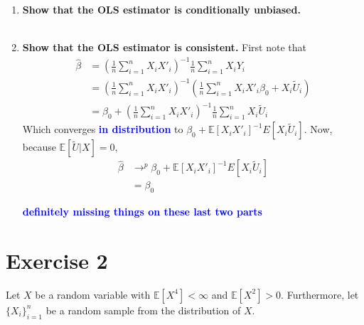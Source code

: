 \documentclass[]{article}
\newcommand{\sumin}{\sum\limits_{i=1}^n} %
\newcommand{\E}{\mathbb{E}}
\newcommand{\fix} [1] {\textbf{\textcolor{blue}{#1}}} %
\begin{document}
\begin{enumerate}[label = (\roman*)]
\item \textbf{Show that the OLS estimator is conditionally unbiased.}\\
\\


\item \textbf{Show that the OLS estimator is consistent.}
First note that 
\begin{align*}
\hat{\beta} & = \left(\frac{1}{n} \sumin X_iX'_i\right)^{-1} \frac{1}{n} \sumin X_iY_i\\
& = \left(\frac{1}{n} \sumin X_iX'_i\right)^{-1} \left(\frac{1}{n} \sumin X_iX'_i\beta_0 + X_i\tilde{U}_i\right) \\
& = \beta_0 + \left(\frac{1}{n} \sumin X_iX'_i\right)^{-1} \frac{1}{n} \sumin X_i\tilde{U}_i
\end{align*}
Which converges \fix{in distribution} to $\beta_0 + \E[X_iX'_i]^{-1} E[X_i\tilde{U}_i]$. Now, because $\mathbb{E} [\tilde{U}|X] = 0$,
\begin{align*}
\hat{\beta} 
& \rightarrow^p \beta_0 + \E[X_iX'_i]^{-1} E[X_i\tilde{U}_i] \\
& = \beta_0 
\end{align*}

\fix{definitely missing things on these last two parts}

\end{enumerate}


\section*{Exercise 2} 
Let $X$ be a random variable with $\E[X^4]<\infty$ and $\E[X^2] > 0$. Furthermore, let $\{X_i\}^n_{i=1}$ be a random sample from the distribution of $X$.
\end{document}
